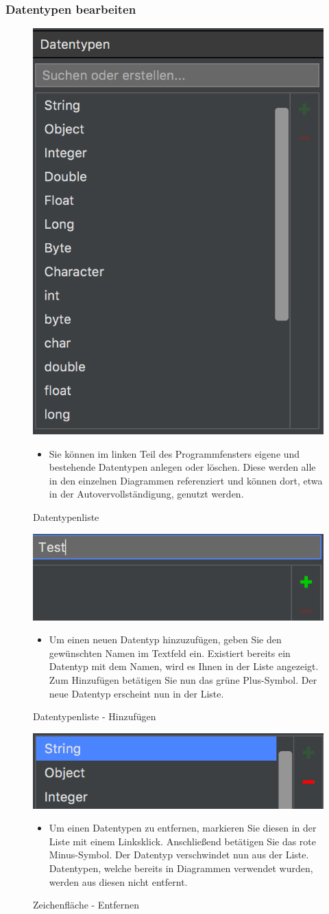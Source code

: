\subsubsection{Datentypen bearbeiten}
\begin{figure}[h!]
	\centering
	\includegraphics[width=.4\textwidth]{Datentypen.png}
	\caption{Datentypenliste}
\begin{itemize}	
\item Sie können im linken Teil des Programmfensters eigene und bestehende Datentypen anlegen oder löschen. Diese werden alle in den einzelnen Diagrammen referenziert und können dort, etwa in der Autovervollständigung, genutzt werden.
\end{itemize}
\end{figure}

\begin{figure}[h!]
	\centering
	\includegraphics[width=.4\textwidth]{Datentypen_Add.png}
	\caption{Datentypenliste - Hinzufügen}
\begin{itemize}	
\item Um einen neuen Datentyp hinzuzufügen, geben Sie den gewünschten Namen im Textfeld ein. Existiert bereits ein Datentyp mit dem Namen, wird es Ihnen in der Liste angezeigt. Zum Hinzufügen betätigen Sie nun das grüne Plus-Symbol. Der neue Datentyp erscheint nun in der Liste.
\end{itemize}
\end{figure}

\begin{figure}[h!]
	\centering
	\includegraphics[width=.4\textwidth]{Datentypen_Delete.png}
	\caption{Zeichenfläche - Entfernen}
\begin{itemize}	
\item Um einen Datentypen zu entfernen, markieren Sie diesen in der Liste mit einem Linksklick. Anschließend betätigen Sie das rote Minus-Symbol. Der Datentyp verschwindet nun aus der Liste. Datentypen, welche bereits in Diagrammen verwendet wurden, werden aus diesen nicht entfernt.
\end{itemize}
\end{figure}


